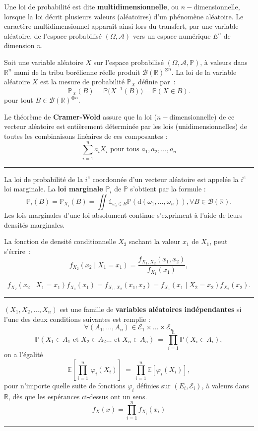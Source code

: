 \begin{f}
			
			
Une loi de probabilité est dite \textbf{multidimensionnelle}, ou $n-$dimensionnelle, lorsque la loi décrit plusieurs valeurs (aléatoires) d'un phénomène aléatoire.  
Le caractère multidimensionnel apparaît ainsi lors du transfert, par une variable aléatoire, de l'espace probabilisé $(\Omega,\mathcal{A})$ vers un espace numérique $E^n$ de dimension $n$. 

Soit une variable aléatoire $X$ sur l'espace probabilisé $(\Omega, \mathcal A, \mathbb{P})$, à valeurs dans ${\mathbb{R}}^n$ muni de la tribu borélienne réelle produit ${\mathcal {B}(\mathbb{R})}^{\otimes n}$. 
La loi de la variable aléatoire $X$ est la mesure de probabilité $\mathbb{P}_X$ définie par~:
$$
\mathbb{P}_X(B) = \mathbb{P}\big(X^{-1}(B)\big) = \mathbb{P}(X \in B).
$$
pour tout $B \in {\mathcal B(\mathbb R)}^{\otimes n}$.

Le théorème de \textbf{Cramer-Wold} assure que la loi ($n-$dimensionnelle) de ce vecteur aléatoire est entièrement déterminée par les lois (unidimensionnelles) de toutes les combinaisons linéaires de ces composantes : 
$$\sum_{i = 1}^n a_i X_i\mbox{ pour tous }a_1, a_2, \dots, a_n$$


\end{f}
\hrule

\begin{f}
La loi de probabilité de la $i^e$ coordonnée d'un vecteur aléatoire est appelée la $i^e$ loi marginale. La \textbf{loi marginale} $\mathbb{P}_i$ de $\mathbb{P}$ s'obtient par la formule :
$$
\mathbb{P}_i(B) = \mathbb{P}_{X_i}(B) = \iint { \mathds{1}}_{\omega_i\in B} \mathbb{P}(\mathrm{d}(\omega_1,\dots,\omega_n)), \forall  B \in \mathcal B(\mathbb{R}).
$$
Les lois marginales d'une loi absolument continue s'expriment à l'aide de leurs densités marginales.


La fonction de densité conditionnelle $X_2$ sachant la valeur $x_1$ de $X_1$, peut s'écrire~:
$$
f_{X_2}(x_2 \mid X_1=x_1) = \frac{f_{X_1, X_2}(x_1,x_2)}{f_{X_1}(x_1)}, 
$$

$$
f_{X_2}(x_2 \mid X_1=x_1)f_{X_1}(x_1) = f_{X_1,X_2}(x_1, x_2) = f_{X_1}(x_1 \mid X_2=x_2)f_{X_2}(x_2). 
$$
\end{f}
\hrule

	\begin{f}[Indépendance]
$(X_1, X_2, \dots,X_n)$ est une famille de \textbf{variables aléatoires indépendantes} si l'une des deux conditions suivantes est remplie :
$$
\forall (A_1,\dots,A_n)\in\mathcal{E}_1\times\dots\times\mathcal{E}_n
$$
$$
\mathbb{P}(X_1\in A_1\text{ et }X_2\in A_2\dots\text{ et }X_n\in A_n)\ =\ \prod_{i=1}^n\mathbb{P}(X_i\in A_i),
$$
on a l'égalité
$$
\mathbb{E}\left[\prod_{i=1}^n\ \varphi_i(X_i)\right]\ =\ \prod_{i=1}^n\mathbb{E}\left[\varphi_i(X_i)\right],
$$
pour n'importe quelle suite de fonctions $\varphi_i$ définies sur $(E_i,\mathcal{E}_i)$, à valeurs dans $\mathbb{R}$, dès que les espérances ci-dessus ont un sens.
$$
f_X(x)= \prod_{i=1}^{n}f_{X_i}(x_i)
$$
\end{f}
\hrule



